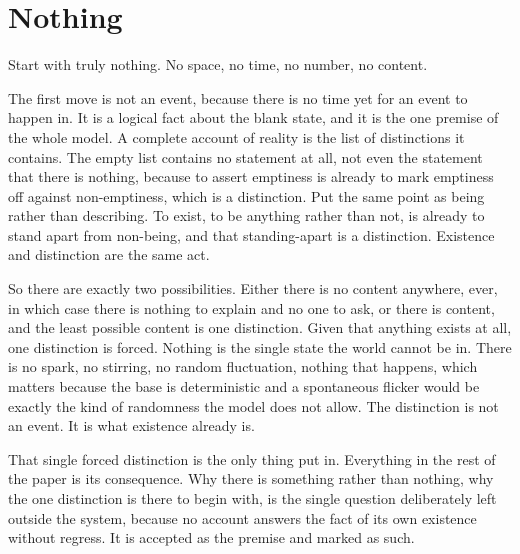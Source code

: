 \section{Nothing}

Start with truly nothing. No space, no time, no number, no content.

The first move is not an event, because there is no time yet for an event to happen in. It is a logical fact about the blank state, and it is the one premise of the whole model. A complete account of reality is the list of distinctions it contains. The empty list contains no statement at all, not even the statement that there is nothing, because to assert emptiness is already to mark emptiness off against non-emptiness, which is a distinction. Put the same point as being rather than describing. To exist, to be anything rather than not, is already to stand apart from non-being, and that standing-apart is a distinction. Existence and distinction are the same act.

So there are exactly two possibilities. Either there is no content anywhere, ever, in which case there is nothing to explain and no one to ask, or there is content, and the least possible content is one distinction. Given that anything exists at all, one distinction is forced. Nothing is the single state the world cannot be in. There is no spark, no stirring, no random fluctuation, nothing that happens, which matters because the base is deterministic and a spontaneous flicker would be exactly the kind of randomness the model does not allow. The distinction is not an event. It is what existence already is.

That single forced distinction is the only thing put in. Everything in the rest of the paper is its consequence. Why there is something rather than nothing, why the one distinction is there to begin with, is the single question deliberately left outside the system, because no account answers the fact of its own existence without regress. It is accepted as the premise and marked as such.
